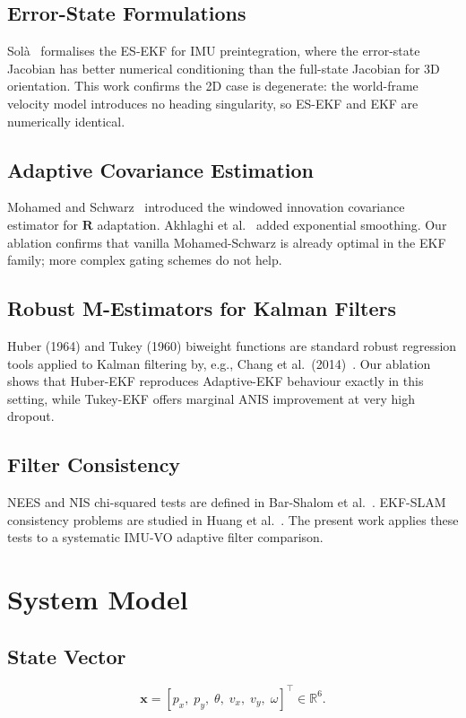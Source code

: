 \documentclass[letterpaper, 10pt, journal]{IEEEtran}
\newcommand{\bmx}{\bm{x}}
\newcommand{\bmR}{\bm{R}}
\newcommand{\R}{\mathbb{R}}
\begin{document}
\subsection{Error-State Formulations}
Sol\`{a}~\cite{sola2017quaternion} formalises the ES-EKF for IMU preintegration,
where the error-state Jacobian has better numerical conditioning than the
full-state Jacobian for 3D orientation. This work confirms the 2D case is
degenerate: the world-frame velocity model introduces no heading singularity,
so ES-EKF and EKF are numerically identical.

\subsection{Adaptive Covariance Estimation}
Mohamed and Schwarz~\cite{mohamed1999adaptive} introduced the windowed
innovation covariance estimator for $\bmR$ adaptation. Akhlaghi et
al.~\cite{akhlaghi2017adaptive} added exponential smoothing.
Our ablation confirms that vanilla Mohamed-Schwarz is already optimal
in the EKF family; more complex gating schemes do not help.

\subsection{Robust M-Estimators for Kalman Filters}
Huber (1964) and Tukey (1960) biweight functions are standard robust
regression tools applied to Kalman filtering by, e.g., Chang
et al.~(2014)~\cite{barshalom2001estimation}. Our ablation shows
that Huber-EKF reproduces Adaptive-EKF behaviour exactly in this setting,
while Tukey-EKF offers marginal ANIS improvement at very high dropout.

\subsection{Filter Consistency}
NEES and NIS chi-squared tests are defined in Bar-Shalom et
al.~\cite{barshalom2001estimation}. EKF-SLAM consistency problems are
studied in Huang et al.~\cite{huang2008analysis}. The present work
applies these tests to a systematic IMU-VO adaptive filter comparison.

\section{System Model}
\label{sec:model}

\subsection{State Vector}
\begin{equation}
  \bmx = [p_x,\; p_y,\; \theta,\; v_x,\; v_y,\; \omega]^\top \in \R^6.
  \label{eq:state}
\end{equation}
\end{document}
